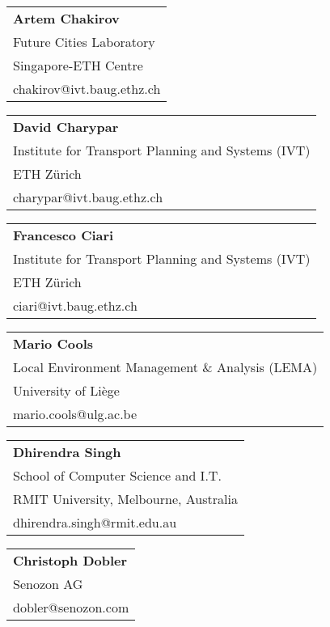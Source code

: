 \begin{tabular}[width=0.48\textwidth]{@{}l}
\textbf{Artem Chakirov} \\
Future Cities Laboratory \\
Singapore-ETH Centre\\
chakirov@ivt.baug.ethz.ch \\
\end{tabular}

\begin{tabular}[width=0.48\textwidth]{@{}l}
\textbf{David Charypar} \\
Institute for Transport Planning and Systems (IVT) \\
ETH Zürich \\
charypar@ivt.baug.ethz.ch \\
\end{tabular}

\begin{tabular}[width=0.48\textwidth]{@{}l}
\textbf{Francesco Ciari} \\
Institute for Transport Planning and Systems (IVT) \\
ETH Zürich \\
ciari@ivt.baug.ethz.ch \\
\end{tabular}

\begin{tabular}[width=0.48\textwidth]{@{}l}
\textbf{Mario Cools} \\
Local Environment Management \& Analysis (LEMA) \\
University of Liège \\
mario.cools@ulg.ac.be \\
\end{tabular}

\begin{tabular}[width=0.48\textwidth]{@{}l}
\textbf{Dhirendra Singh} \\
School of Computer Science and I.T. \\
RMIT University, Melbourne, Australia \\
dhirendra.singh@rmit.edu.au \\
\end{tabular}

\begin{tabular}[width=0.48\textwidth]{@{}l}
\textbf{Christoph Dobler} \\
Senozon AG \\
dobler@senozon.com \\
\end{tabular}

